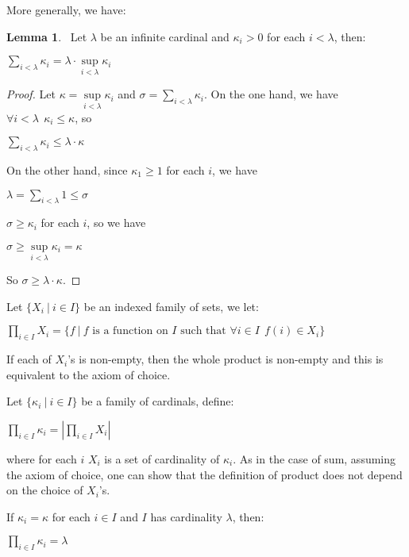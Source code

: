 \documentclass[8pt]{article}
\theoremstyle{definition}
\theoremstyle{definition}
\theoremstyle{definition}
\theoremstyle{definition}
\theoremstyle{definition}
\theoremstyle{definition}
\theoremstyle{definition}
\theoremstyle{definition}
\newtheorem{lemma}{Lemma}[section]
\theoremstyle{definition}
\theoremstyle{definition}
\theoremstyle{definition}
\theoremstyle{definition}
\theoremstyle{definition}
\theoremstyle{definition}
\theoremstyle{question}
\begin{document}
More generally, we have:
\begin{lemma}~\label{cardfact2}
  Let $\lambda$ be an infinite cardinal and $\kappa_i > 0$ for each $i < \lambda$, then:
  \begin{center}
    $\sum \limits_{i < \lambda} \kappa_i = \lambda \cdot \sup \limits_{i < \lambda} \kappa_i$
  \end{center}
\end{lemma}
\begin{proof}
  Let $\kappa = \sup \limits_{i < \lambda} \kappa_i$ and $\sigma = \sum \limits_{i < \lambda} \kappa_i$.
  On the one hand, we have $\forall i < \lambda \:\: \kappa_i \leq \kappa$, so
  \begin{center}
    $\sum \limits_{i < \lambda} \kappa_i \leq \lambda \cdot \kappa$
  \end{center}

  On the other hand, since $\kappa_1 \geq 1$ for each $i$, we have
  \begin{center}
  $\lambda = \sum \limits_{i < \lambda} 1 \leq \sigma$
  \end{center}
  $\sigma \geq \kappa_i$ for each $i$, so we have
  \begin{center}
    $\sigma \geq \sup \limits_{i < \lambda} \kappa_i = \kappa$
  \end{center}
  So $\sigma \geq \lambda \cdot \kappa$.
\end{proof}

Let $\{ X_i \: | \: i \in I \}$ be an indexed family of sets, we let:
\begin{center}
  $\prod \limits_{i \in I} X_i = \{ f \: | \: \text{$f$ is a function on $I$ such that $\forall i \in I \:\: f(i) \in X_i$} \}$
\end{center}
If each of $X_i$'s is non-empty, then the whole product is non-empty and this is equivalent to the axiom of choice.

Let $\{ \kappa_i \: | \: i \in I \}$ be a family of cardinals, define:
\begin{center}
  $\prod \limits_{i \in I} \kappa_i = |\prod \limits_{i \in I} X_i|$
\end{center}
where for each $i$ $X_i$ is a set of cardinality of $\kappa_i$. 
As in the case of sum, assuming the axiom of choice, one can show that the definition of product
does not depend on the choice of $X_i$'s.

If $\kappa_i = \kappa$ for each $i \in I$ and $I$ has cardinality $\lambda$, then:
\begin{center}
  $\prod \limits_{i \in I} \kappa_i = \lambda$
\end{center}
\end{document}
